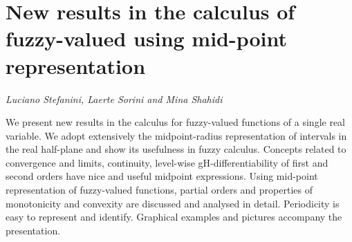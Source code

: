 \documentclass[../booklet.tex]{subfiles}
\begin{document}
\section[New results in the calculus of fuzzy-valued using mid-point representation. {\it Luciano Stefanini, Laerte Sorini and Mina Shahidi}]{New results in the calculus of fuzzy-valued using mid-point representation}
  

\begin{center}
  {\it Luciano Stefanini, Laerte Sorini and Mina Shahidi}
\end{center}

\vskip 0.8cm



	We present new results in the calculus for fuzzy-valued functions of a
	single real variable. We adopt extensively the midpoint-radius
	representation of intervals in the real half-plane and show its usefulness
	in fuzzy calculus. Concepts related to convergence and limits, continuity,
	level-wise gH-differentiability of first and second orders have nice and useful midpoint expressions.
	Using mid-point representation of fuzzy-valued functions, partial orders and properties of monotonicity and convexity are discussed and analysed in detail.  Periodicity is easy to represent and identify. Graphical examples and pictures accompany the presentation. 


\end{document}
